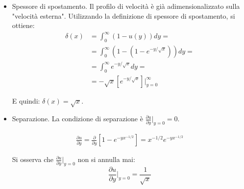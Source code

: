 \begin{itemize}
\item Spessore di spostamento. Il profilo di velocità è già adimensionalizzato sulla "velocità esterna". Utilizzando la definizione di spessore di spostamento, si ottiene:
\begin{equation}
\begin{aligned}
  \delta(x) & = \int_{0}^{\infty} \left( 1 - u(y) \right) dy = \\
  & = \int_{0}^{\infty} (1 - (1-e^{-y/\sqrt{x}}))dy  = \\
  & = \int_{0}^{\infty} e^{-y/\sqrt{x}} dy = \\
  & = -\sqrt{x} [e^{-y/\sqrt{x}}]\big|_{y=0}^{\infty}
\end{aligned}
\end{equation}

E quindi: $\delta(x) = \sqrt{x}$.



\item Separazione. La condizione di separazione è $\frac{\partial u}{\partial y}\big|_{y=0} = 0$.

\begin{equation}
\begin{aligned}
  \frac{\partial u}{\partial y}  = 
  \frac{\partial}{\partial y} \displaystyle \left[   1-e^{-y x^{-1/2}} \right] = 
   x^{-1/2} e^{-y x^{-1/2}}
\end{aligned}
\end{equation}



Si osserva che $\frac{\partial u}{\partial y}\big|_{y=0}$ non si annulla mai:
\begin{equation}
  \displaystyle\frac{\partial u}{\partial y}\displaystyle\Big|_{y=0} = \frac{1}{\sqrt{x}}
\end{equation}

\end{itemize}

